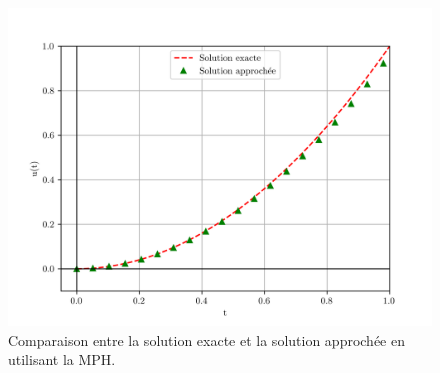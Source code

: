 \begin{figure}[H]
    \centering
    \includegraphics[scale = 0.7]{IMAGES/plot (3).png}
    \caption{Comparaison entre la solution exacte et la solution approchée en utilisant la MPH.}
\end{figure}

